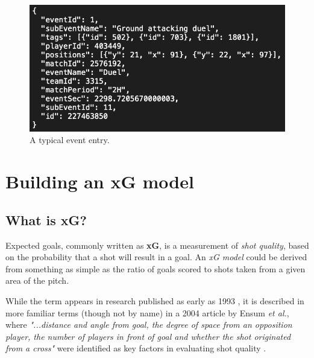 \documentclass{l4proj}
\begin{document}
\begin{figure}[h]
    \centering
    \includegraphics[scale=0.6]{images/json2.png}   
    \caption{A typical event entry.}
    \label{fig:json} 
\end{figure}



\section{Building an xG model}

\subsection{What is xG?}

Expected goals, commonly written as \textbf{xG}, is a measurement of \textit{shot quality}, based on the probability that a shot will result in a goal. An \textit{xG model} could be derived from something as simple as the ratio of goals scored to shots taken from a given area of the pitch.  

While the term appears in research published as early as 1993 \cite{xg901}, it is described in more familiar terms (though not by name) in a 2004 article by Ensum \textit{et al.}, where\textit{ "...distance and angle from goal, the degree of space from an opposition player, the number of players in front of goal and whether the shot originated from a cross"} were identified as key factors in evaluating shot quality \cite{ens04}. 
\end{document}
